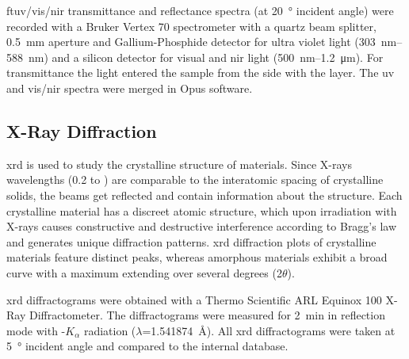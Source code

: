 \Gls{ft}\gls{uv}/\gls{vis}/\gls{nir} transmittance and reflectance spectra (at \SI{20}{\degree} incident angle) were recorded with a Bruker Vertex 70 spectrometer with a quartz beam splitter, \SI{0.5}{\milli\meter} aperture and Gallium-Phosphide detector for ultra violet light (\SI{303}{\nano\meter}--\SI{588} {\nano\meter}) and a silicon detector for visual and \gls{nir} light (\SI{500}{\nano\meter}--\SI{1.2}{\micro\meter}). 
For transmittance the light entered the sample from the side with the layer. 
The \gls{uv} and \gls{vis}/\gls{nir} spectra were merged in Opus software. %
%




\subsection{X-Ray Diffraction}
\gls{xrd} is used to study the crystalline structure of materials.
Since X-rays wavelengths (\num{0.2} to ) are comparable to the interatomic spacing of crystalline solids, 
the beams get reflected and contain information about the structure\cite{Kaliva2020}.
Each crystalline material has a discreet atomic structure, which upon irradiation with 
X-rays causes constructive and destructive interference according to Bragg's law and generates unique diffraction patterns. 
\Gls{xrd} diffraction plots of crystalline materials feature distinct peaks, whereas amorphous materials exhibit a broad curve with a maximum extending over several degrees (2$\theta$).

\Gls{xrd} diffractograms were obtained with a Thermo Scientific ARL Equinox 100 X-Ray Diffractometer.
The diffractograms were measured for \SI{2}{\minute} in reflection mode with -$K_{\alpha}$ radiation ($\lambda$=\SI{1.541874}{\angstrom}).
All \gls{xrd} diffractograms were taken at \SI{5}{\degree} incident angle and compared to the internal database.

